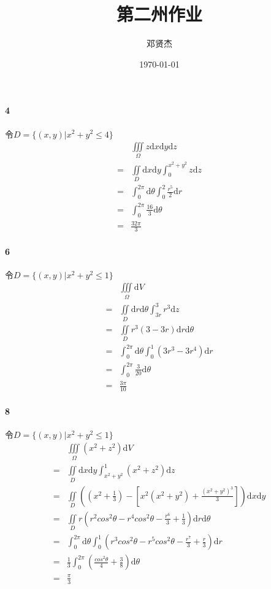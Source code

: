 \documentclass[UTF8]{ctexart}
\title{第二州作业}
\author{邓贤杰}
\date{\today}
\begin{document}
    \maketitle
    \paragraph*{4}
    令$D=\{(x,y)| x^2 + y^2 \le 4\}$
    \begin{align*}
        &\iiint \limits_{\Omega} z \mathrm{d}x \mathrm{d}y \mathrm{d}z \\
        =& \iint \limits
        _D \mathrm{d}x \mathrm{d}y \int_{0}^{x^2+y^2} z \mathrm{d}z \\
        =& \int_{0}^{2\pi} \mathrm{d}\theta \int_{0}^{2} \frac{r^5}{2} \mathrm{d}r \\
        =& \int_{0}^{2\pi} \frac{16}{3} \mathrm{d}\theta \\
        =& \frac{32\pi}{3}  
    \end{align*}
\paragraph*{6}
令$D=\{(x,y)| x^2 + y^2 \le 1\}$
\begin{align*}
    &\iiint \limits_{\Omega} \mathrm{d}V \\
    =& \iint \limits_D \mathrm{d}r \mathrm{d}\theta \int_{3r}^{3} r^3 \mathrm{d}z \\
    =& \iint \limits_D r^3(3 - 3r)\mathrm{d}r \mathrm{d}\theta \\
    =& \int_{0}^{2\pi} \mathrm{d}\theta \int_{0}^{1} (3r^3 - 3r^4)\mathrm{d}r \\
    =& \int_{0}^{2\pi} \frac{3}{20} \mathrm{d}\theta \\
    =& \frac{3\pi}{10} 
\end{align*}
\paragraph*{8}
令$D=\{(x,y)| x^2 + y^2 \le 1\}$
\begin{align*}
    &\iiint \limits_{\Omega} (x^2+z^2)\mathrm{d}V \\
    =& \iint \limits_D \mathrm{d}x \mathrm{d}y \int_{x^2+y^2}^{1} (x^2+z^2)\mathrm{d}z \\
    =& \iint \limits_D \left((x^2+\frac{1}{3} )-[x^2(x^2+y^2)+\frac{(x^2+y^2)^3}{3}]\right)\mathrm{d}x \mathrm{d}y \\
    =& \iint \limits_D r(r^2cos^2\theta - r^4 cos^2\theta - \frac{r^6}{3} + \frac{1}{3}) \mathrm{d}r \mathrm{d}\theta \\
    =& \int_{0}^{2\pi} \mathrm{d}\theta\int_{0}^{1} \left(r^3cos^2\theta-r^5cos^2\theta - \frac{r^7}{3} + \frac{r}{3} \right) \mathrm{d}r \\
    =& \frac{1}{3} \int_{0}^{2\pi} (\frac{cos^2\theta}{4} + \frac{3}{8} ) \mathrm{d}\theta \\
    =& \frac{\pi}{3}
\end{align*}
\end{document}
